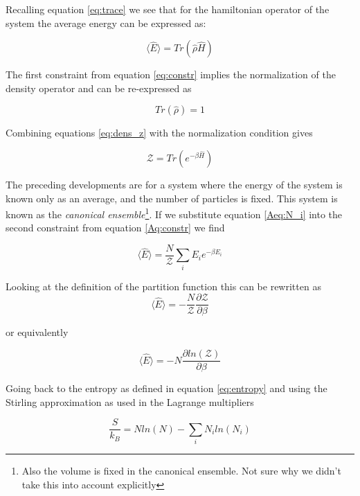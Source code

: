 Recalling equation \ref{eq:trace} we see that for the hamiltonian operator of the system the average energy can be expressed as:

\begin{equation}
    \langle \hat{E} \rangle = Tr \left( \hat{\rho} \hat{H} \right)
\end{equation}

The first constraint from equation \ref{eq:constr} implies the normalization of the density operator and can be re-expressed as

\begin{equation}
    Tr(\hat{\rho}) = 1
\end{equation}

Combining equations \ref{eq:dens_z} with the normalization condition gives

\begin{equation}
    \mathcal{Z} = Tr(e^{-\beta \hat{H}})
\end{equation}

The preceding developments are for a system where the energy of the system is known only as an average, and the number of particles is fixed. This system is known as the \textit{canonical ensemble}\footnote[1]{Also the volume is fixed in the canonical ensemble. Not sure why we didn't take this into account explicitly}. If we substitute equation \ref{Aeq:N_i} into the second constraint from equation \ref{Aq:constr} we find

\begin{equation}
    \langle \hat{E} \rangle = \frac{N}{\mathcal{Z}} \sum_{i} E_i e^{-\beta E_i}
\end{equation}

Looking at the definition of the partition function this can be rewritten as 
\begin{equation}
    \langle \hat{E} \rangle = - \frac{N}{\mathcal{Z}} \frac{\partial \mathcal{Z}}{\partial \beta}
\end{equation}

or equivalently

\begin{equation}
    \langle \hat{E} \rangle = - N \frac{\partial ln \left( \mathcal{Z} \right)}{\partial \beta}
\end{equation}

Going back to the entropy as defined in equation \ref{eq:entropy} and using the Stirling approximation as used in the Lagrange multipliers

\begin{equation}
    \frac{S}{k_B} = N ln(N) - \sum_{i} N_i ln(N_i) 
\end{equation}

